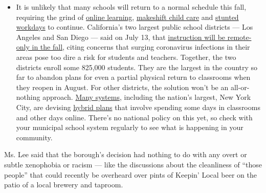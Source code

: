 \begin{itemize}
  \begin{itemize}
  \tightlist
  \item
    It is unlikely that many schools will return to a normal schedule
    this fall, requiring the grind of
    \href{https://www.nytimes3xbfgragh.onion/2020/06/05/us/coronavirus-education-lost-learning.html?action=click\&pgtype=Article\&state=default\&region=MAIN_CONTENT_3\&context=storylines_faq}{online
    learning},
    \href{https://www.nytimes3xbfgragh.onion/2020/05/29/us/coronavirus-child-care-centers.html?action=click\&pgtype=Article\&state=default\&region=MAIN_CONTENT_3\&context=storylines_faq}{makeshift
    child care} and
    \href{https://www.nytimes3xbfgragh.onion/2020/06/03/business/economy/coronavirus-working-women.html?action=click\&pgtype=Article\&state=default\&region=MAIN_CONTENT_3\&context=storylines_faq}{stunted
    workdays} to continue. California's two largest public school
    districts --- Los Angeles and San Diego --- said on July 13, that
    \href{https://www.nytimes3xbfgragh.onion/2020/07/13/us/lausd-san-diego-school-reopening.html?action=click\&pgtype=Article\&state=default\&region=MAIN_CONTENT_3\&context=storylines_faq}{instruction
    will be remote-only in the fall}, citing concerns that surging
    coronavirus infections in their areas pose too dire a risk for
    students and teachers. Together, the two districts enroll some
    825,000 students. They are the largest in the country so far to
    abandon plans for even a partial physical return to classrooms when
    they reopen in August. For other districts, the solution won't be an
    all-or-nothing approach.
    \href{https://bioethics.jhu.edu/research-and-outreach/projects/eschool-initiative/school-policy-tracker/}{Many
    systems}, including the nation's largest, New York City, are
    devising
    \href{https://www.nytimes3xbfgragh.onion/2020/06/26/us/coronavirus-schools-reopen-fall.html?action=click\&pgtype=Article\&state=default\&region=MAIN_CONTENT_3\&context=storylines_faq}{hybrid
    plans} that involve spending some days in classrooms and other days
    online. There's no national policy on this yet, so check with your
    municipal school system regularly to see what is happening in your
    community.
  \end{itemize}
\end{itemize}

Ms. Lee said that the borough's decision had nothing to do with any
overt or subtle xenophobia or racism --- like the discussions about the
cleanliness of ``those people'' that could recently be overheard over
pints of Keepin' Local beer on the patio of a local brewery and taproom.

